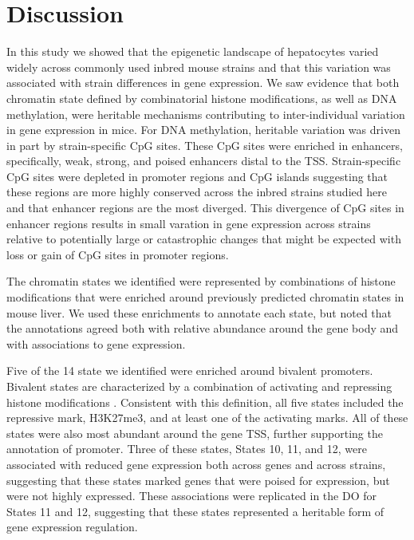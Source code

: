 \documentclass[
  11pt,
]{article}
\begin{document}
\hypertarget{discussion}{%
\section{Discussion}\label{discussion}}

In this study we showed that the epigenetic landscape of hepatocytes
varied widely across commonly used inbred mouse strains and that this
variation was associated with strain differences in gene expression. We
saw evidence that both chromatin state defined by combinatorial histone
modifications, as well as DNA methylation, were heritable mechanisms
contributing to inter-individual variation in gene expression in mice.
For DNA methylation, heritable variation was driven in part by
strain-specific CpG sites. These CpG sites were enriched in enhancers,
specifically, weak, strong, and poised enhancers distal to the TSS.
Strain-specific CpG sites were depleted in promoter regions and CpG
islands suggesting that these regions are more highly conserved across
the inbred strains studied here and that enhancer regions are the most
diverged. This divergence of CpG sites in enhancer regions results in
small varation in gene expression across strains relative to potentially
large or catastrophic changes that might be expected with loss or gain
of CpG sites in promoter regions.

The chromatin states we identified were represented by combinations of
histone modifications that were enriched around previously predicted
chromatin states in mouse liver. We used these enrichments to annotate
each state, but noted that the annotations agreed both with relative
abundance around the gene body and with associations to gene expression.

Five of the 14 state we identified were enriched around bivalent
promoters. Bivalent states are characterized by a combination of
activating and repressing histone modifications
\citep{pmid23788621, pmid22513113}. Consistent with this definition, all
five states included the repressive mark, H3K27me3, and at least one of
the activating marks. All of these states were also most abundant around
the gene TSS, further supporting the annotation of promoter. Three of
these states, States 10, 11, and 12, were associated with reduced gene
expression both across genes and across strains, suggesting that these
states marked genes that were poised for expression, but were not highly
expressed. These associations were replicated in the DO for States 11
and 12, suggesting that these states represented a heritable form of
gene expression regulation.
\end{document}
